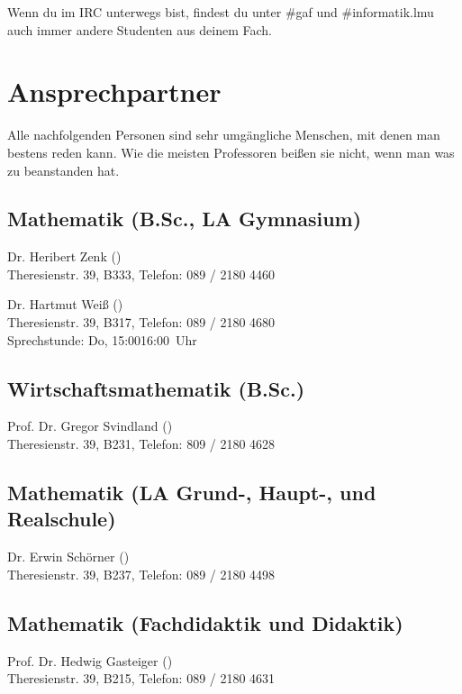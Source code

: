 Wenn du im IRC unterwegs bist, findest du unter \#gaf und \#informatik.lmu
auch immer andere Studenten aus deinem Fach.

\begin{urlList}
\end{urlList}

\section{Ansprechpartner}

Alle nachfolgenden Personen sind sehr umgängliche Menschen, mit denen
man bestens reden kann. Wie die meisten Professoren beißen sie nicht,
wenn man was zu beanstanden hat.

\subsection*{Mathematik (B.Sc., LA Gymnasium)}
Dr. Heribert Zenk ()\\
Theresienstr. 39, B333, Telefon: 089 / 2180 \emd{} 4460

Dr. Hartmut Weiß ()\\
Theresienstr. 39, B317, Telefon: 089 / 2180 \emd{} 4680\\
Sprechstunde: Do, 15:00\emd{}16:00~Uhr

\subsection*{Wirtschaftsmathematik (B.Sc.)}
Prof. Dr. Gregor Svindland ()\\
Theresienstr. 39, B231, Telefon: 809 / 2180 \emd{} 4628

\subsection*{Mathematik (LA Grund-, Haupt-, und Realschule)}
Dr. Erwin Schörner ()\\
Theresienstr. 39, B237, Telefon: 089 / 2180 \emd{} 4498

\subsection*{Mathematik (Fachdidaktik und Didaktik)}
Prof. Dr. Hedwig Gasteiger ()\\
Theresienstr. 39, B215, Telefon: 089 / 2180 \emd{} 4631

